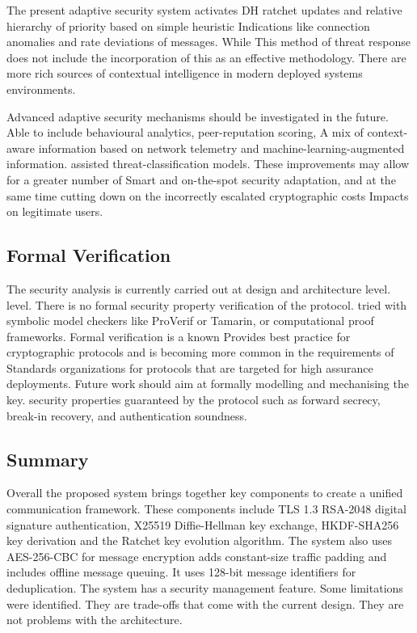 \documentclass[conference]{IEEEtran}
\begin{document}
The present adaptive security system activates DH ratchet updates and
relative hierarchy of priority based on simple heuristic
Indications like connection anomalies and rate deviations of messages.  While
This method of threat response does not include the incorporation of this as an effective methodology.
There are more rich sources of contextual intelligence in modern deployed systems
environments.

Advanced adaptive security mechanisms should be investigated in the future.
Able to include behavioural analytics, peer-reputation scoring,
A mix of context-aware information based on network telemetry and machine-learning-augmented information.
assisted threat-classification models.  These improvements may allow for a greater number of
Smart and on-the-spot security adaptation, and at the same time cutting down on the
incorrectly escalated cryptographic costs
Impacts on legitimate users.

\subsection{Formal Verification}

The security analysis is currently carried out at design and architecture level.
level.  There is no formal security property verification of the protocol.
tried with symbolic model checkers like ProVerif or Tamarin, or
computational proof frameworks.  Formal verification is a known
Provides best practice for cryptographic protocols and is becoming more common in the requirements of
Standards organizations for protocols that are targeted for high assurance deployments.
Future work should aim at formally modelling and mechanising the key.
security properties guaranteed by the protocol such as forward secrecy,
break-in recovery, and authentication soundness.

\subsection{Summary}

Overall the proposed system brings together key components to create a unified communication framework.
These components include TLS 1.3 RSA-2048 digital signature authentication, X25519 Diffie-Hellman key exchange,
HKDF-SHA256 key derivation and the Ratchet key evolution algorithm.
The system also uses AES-256-CBC for message encryption adds constant-size traffic padding
and includes offline message queuing.
It uses 128-bit message identifiers for deduplication.
The system has a security management feature.
Some limitations were identified. They are trade-offs that come with the current design.
They are not problems with the architecture.
\end{document}
